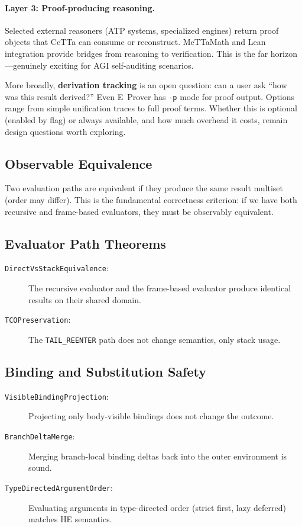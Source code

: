 \documentclass[11pt]{article}
\newcommand{\code}[1]{\texttt{#1}}
\newcommand{\HE}{\textup{HE}}
\newcommand{\CeTTa}{\textup{CeTTa}}
\begin{document}
\paragraph{Layer 3: Proof-producing reasoning.}
Selected external reasoners (ATP systems, specialized engines) return
proof objects that \CeTTa{} can consume or reconstruct.  MeTTaMath and
Lean integration provide bridges from reasoning to verification.  This
is the far horizon---genuinely exciting for AGI self-auditing scenarios.

More broadly, \textbf{derivation tracking} is an open question: can a user
ask ``how was this result derived?''  Even E~Prover has \code{-p} mode for
proof output.  Options range from simple unification traces to full proof
terms.  Whether this is optional (enabled by flag) or always available,
and how much overhead it costs, remain design questions worth exploring.

\subsection{Observable Equivalence}

Two evaluation paths are equivalent if they produce the same result
multiset (order may differ).  This is the fundamental correctness
criterion: if we have both recursive and frame-based evaluators, they
must be observably equivalent.

\subsection{Evaluator Path Theorems}

\begin{description}
\item[\code{DirectVsStackEquivalence}:]
  The recursive evaluator and the frame-based evaluator produce
  identical results on their shared domain.
\item[\code{TCOPreservation}:]
  The \code{TAIL\_REENTER} path does not change semantics, only
  stack usage.
\end{description}

\subsection{Binding and Substitution Safety}

\begin{description}
\item[\code{VisibleBindingProjection}:]
  Projecting only body-visible bindings does not change the outcome.
\item[\code{BranchDeltaMerge}:]
  Merging branch-local binding deltas back into the outer environment
  is sound.
\item[\code{TypeDirectedArgumentOrder}:]
  Evaluating arguments in type-directed order (strict first, lazy
  deferred) matches \HE{} semantics.
\end{description}
\end{document}
